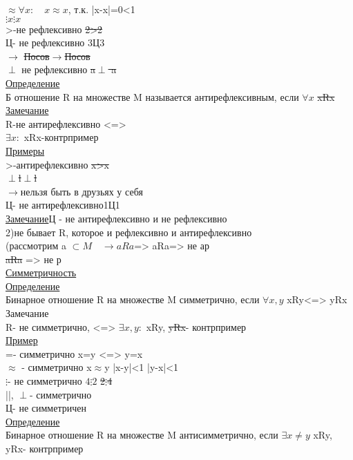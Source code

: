 \documentclass{article}
\begin{document}
$\approx$\qquad$\forall x:\quad x\approx x$, т.к. |x-x|=0<1\\
$\vdots$\qquad $x\vdots x$\\
>-не рефлексивно \sout{2>2}\\
Ц- не рефлексивно 3Ц3\\
$\rightarrow$ \sout{Посов$\rightarrow$Посов}\\
$\perp$ не рефлексивно  \sout{a$\perp$ a}\\
\underline{Определение}\\
Б отношение R на множестве M называется антирефлексивным, если $\forall x$ \sout{xRx}\\
\underline{Замечание}\\
R-не антирефлексивно <=>\\
$\exists x:$ xRx-контрпример\\
\underline{Примеры}\\
>-антирефлексивно \sout{x>x}\\
$\perp$\qquad \sout{l$\perp$l}\\
$\rightarrow$\qquad нельзя быть в друзьях у себя\\
Ц- не антирефлексивно\qquad 1Ц1\\
\underline{Замечание}Ц - не антирефлексивно и не рефлексивно\\
2)не бывает R, которое и рефлексивно и антирефлексивно\\
(рассмотрим a $\subset M\quad \rightarrow aRa$=> aRa=> не ар\\
\sout{aRa} => не р\\
\underline{Симметричность}\\
\underline{Определение}\\
Бинарное отношение R на множестве M симметрично, если $\forall x,y$ xRy<=> yRx\\
Замечание\\
R- не симметрично, <=> $\exists x,y:$ xRy, \sout{yRx}- контрпример\\
\underline{Пример}\\
=- симметрично x=y <=> y=x\\
$\approx$ - симметрично x$\approx$y |x-y|<1 |y-x|<1\\
$\vdots$- не симметрично $4\vdots2$ \sout{2$\vdots$4}\\
||, $\perp$- симметрично\\
Ц- не симметричен\\
\underline{Определение}\\
Бинарное отношение R на множестве M антисимметрично, если $\exists x\neq y$ xRy, yRx- контрпример\\
\end{document}
